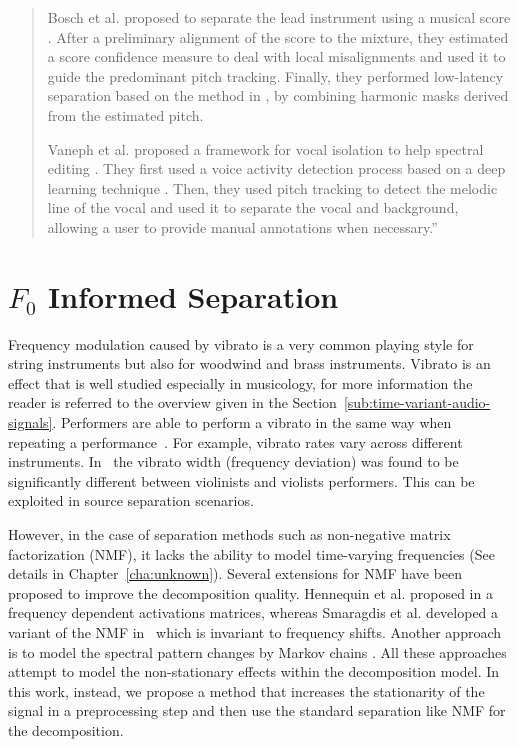 \begin{quote}
\par
Bosch et al. proposed to separate the lead instrument using a musical score \cite{bosch12}. After a preliminary alignment of the score to the mixture, they estimated a score confidence measure to deal with local misalignments and used it to guide the predominant pitch tracking. Finally, they performed low-latency separation based on the method in \cite{marxer12}, by combining harmonic masks derived from the estimated pitch.
\par
Vaneph et al. proposed a framework for vocal isolation to help spectral editing \cite{vaneph16}. They first used a voice activity detection process based on a deep learning technique \cite{Leglaive15}. Then, they used pitch tracking to detect the melodic line of the vocal and used it to separate the vocal and background, allowing a user to provide manual annotations when necessary.''
\end{quote}

\section{$F_0$ Informed Separation}
\label{sub:frequency_modulation}


Frequency modulation caused by vibrato is a very common playing style for string instruments but also for woodwind and brass instruments.
Vibrato is an effect that is well studied especially in musicology, for more information the reader is referred to the overview given in the Section~\ref{sub:time-variant-audio-signals}.
Performers are able to perform a vibrato in the same way when repeating a performance~\cite{fletcher01}.
For example, vibrato rates vary across different instruments.
In~\cite{macleod06} the vibrato width (frequency deviation) was found to be significantly different between violinists and violists performers.
This can be exploited in source separation scenarios.
\par
However, in the case of separation methods such as non-negative matrix factorization (NMF), it lacks the ability to model time-varying frequencies (See details in Chapter~\ref{cha:unknown}).
Several extensions for NMF have been proposed to improve the decomposition quality.
Hennequin et al. proposed in \cite{hennequin11} a frequency dependent activations matrices, whereas Smaragdis et al. developed a variant of the NMF in~\cite{smaragdis08} which is invariant to frequency shifts.
Another approach is to model the spectral pattern changes by Markov chains \cite{nakano10}. All these approaches attempt to model the non-stationary effects within the decomposition model.
In this work, instead, we propose a method that increases the stationarity of the signal in a preprocessing step and then use the standard separation like NMF for the decomposition.\\

